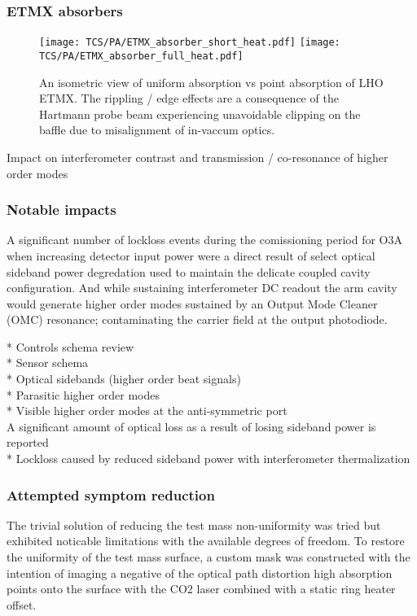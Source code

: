 \subsubsection{ETMX absorbers}
\begin{figure}[H]
  \centering
  \begin{subcaptiongroup}
	  \texttt{[image: TCS/PA/ETMX\_absorber\_short\_heat.pdf]}
	  \label{subfig:etmxpajustself}
	  \texttt{[image: TCS/PA/ETMX\_absorber\_full\_heat.pdf]}
	  \label{subfig:etmxpaselfplusabs}
  \end{subcaptiongroup}
  \captionsetup{subrefformat=parens}
  \hfill
  \caption{An isometric view of uniform absorption vs point absorption of LHO ETMX. The rippling / edge effects are a consequence of the Hartmann probe beam experiencing unavoidable clipping on the baffle due to misalignment of in-vaccum optics.}
  \label{fig:ETMXpabs}
\end{figure}

Impact on interferometer contrast and transmission / co-resonance of higher order modes

\subsubsection{Notable impacts}
A significant number of lockloss events during the comissioning period for O3A when increasing detector input power were a direct result of select optical sideband power degredation used to maintain the delicate coupled cavity configuration. And while sustaining interferometer DC readout the arm cavity would generate higher order modes sustained by an Output Mode Cleaner (OMC) resonance; contaminating the carrier field at the output photodiode.

	* Controls schema review \\
		* Sensor schema \\
		* Optical sidebands (higher order beat signals) \\
	* Parasitic higher order modes \\
		* Visible higher order modes at the anti-symmetric port \\
A significant amount of optical loss as a result of losing sideband power is reported \\
	* Lockloss caused by reduced sideband power with interferometer thermalization \\

\subsubsection{Attempted symptom reduction}
The trivial solution of reducing the test mass non-uniformity was tried but exhibited noticable limitations with the available degrees of freedom. To restore the uniformity of the test mass surface, a custom mask was constructed with the intention of imaging a negative of the optical path distortion high absorption points onto the surface with the CO2 laser combined with a static ring heater offset. 

